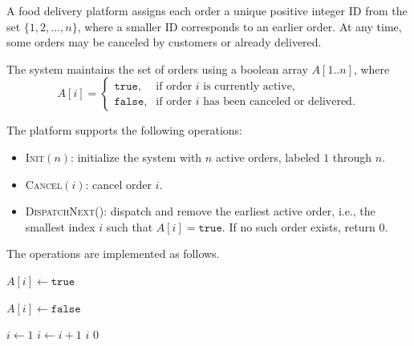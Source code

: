 \problem{}

A food delivery platform assigns each order a unique positive integer ID
from the set $\{1,2,\dots,n\}$, where a smaller ID corresponds to an earlier order.
At any time, some orders may be canceled by customers or already delivered.

The system maintains the set of orders using a boolean array $A[1..n]$,
where
\[
A[i] =
\begin{cases}
\texttt{true},  & \text{if order $i$ is currently active}, \\
\texttt{false}, & \text{if order $i$ has been canceled or delivered}.
\end{cases}
\]

The platform supports the following operations:

\begin{itemize}
  \item \textsc{Init}$(n)$: initialize the system with $n$ active orders,
        labeled $1$ through $n$.
  \item \textsc{Cancel}$(i)$: cancel order $i$.
  \item \textsc{DispatchNext}(): dispatch and remove the earliest active order,
        i.e., the smallest index $i$ such that $A[i] = \texttt{true}$.
        If no such order exists, return $0$.
\end{itemize}

The operations are implemented as follows.

\begin{algorithm}[H]
\caption{Initialization}
\begin{algorithmic}[1]
    \State $A[i] \gets \texttt{true}$
  \EndFor
\EndProcedure
\end{algorithmic}
\end{algorithm}

\begin{algorithm}[H]
\caption{Canceling an Order}
\begin{algorithmic}[1]
  \State $A[i] \gets \texttt{false}$
\EndProcedure
\end{algorithmic}
\end{algorithm}

\begin{algorithm}[H]
\caption{Dispatching the Next Order}
\begin{algorithmic}[1]
  \State $i \gets 1$
    \State $i \gets i + 1$
  \EndWhile
    \State {}
    \State \Return $i$
  \Else
    \State \Return $0$
  \EndIf
\EndProcedure
\end{algorithmic}
\end{algorithm}

